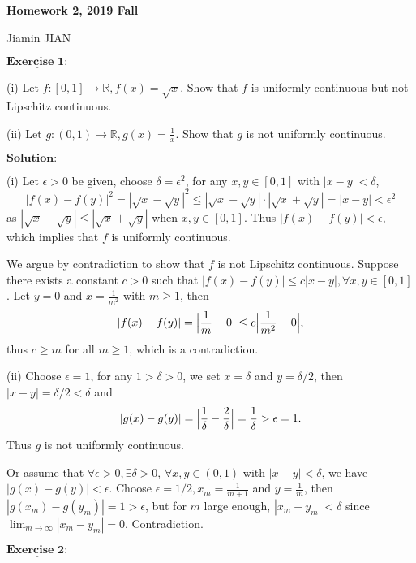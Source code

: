 \documentclass[12pt,a4paper]{ctexart}
\begin{document}
\begin{center}
\textbf{ Homework 2, 2019 Fall}
\vspace{8pt}

Jiamin JIAN
\end{center}

\vspace{12pt}

$\underline{\textbf{Exercise 1:}}$

(i) Let $f: [0,1] \to \mathbb R, f(x) = \sqrt{x}$. Show that $f$ is uniformly continuous but not Lipschitz continuous.

(ii) Let $g: (0,1) \to \mathbb R, g(x) = \frac{1}{x}$. Show that $g$ is not uniformly continuous.

 
\vspace{8pt}
$\textbf{Solution:}$

(i) Let $\epsilon > 0$ be given, choose $\delta = \epsilon^2$, for any $x, y \in [0,1]$ with $|x - y| < \delta$,
$$|f(x) - f(y)|^2 = |\sqrt{x} - \sqrt{y}|^2 \leq |\sqrt{x} - \sqrt{y}| \cdot |\sqrt{x} + \sqrt{y}| = |x - y| < \epsilon^2$$
as $|\sqrt{x} - \sqrt{y}| \leq |\sqrt{x} + \sqrt{y}|$ when $x, y \in [0,1]$. Thus $|f(x) - f(y)| < \epsilon$, which implies that $f$ is uniformly continuous.

We argue by contradiction to show that $f$ is not Lipschitz continuous. Suppose there exists a constant $c>0$ such that $|f(x) - f(y)| \leq c |x-y|, \forall x, y \in [0,1]$. Let $y = 0$ and $x = \frac{1}{m^2}$ with $m \geq 1$, then
$$|f(x) - f(y)| = \Big{|} \frac{1}{m} - 0 \Big{|} \leq c \Big{|} \frac{1}{m^2} - 0 \Big{|},$$
thus $c \geq m$ for all $m \geq 1$, which is a contradiction.

(ii) Choose $\epsilon = 1$, for any $1 > \delta >0$, we set $x = \delta$ and $y = \delta/2$, then $|x - y| = \delta / 2 < \delta$ and
$$|g(x) - g(y)| = \Big{|} \frac{1}{\delta} - \frac{2}{\delta} \Big{|} = \frac{1}{\delta} > \epsilon = 1.$$
Thus $g$ is not uniformly continuous.

Or assume that $\forall \epsilon > 0, \exists \delta > 0$, $\forall x, y \in (0,1)$ with $|x - y| < \delta$, we have $|g(x) - g(y)| < \epsilon$. Choose $\epsilon = 1/2, x_m = \frac{1}{m+1}$ and $y = \frac{1}{m}$, then $|g(x_m) - g(y_m)| = 1 > \epsilon$, but for $m$ large enough, $|x_m - y_m| < \delta$ since $\lim_{m \to \infty} |x_m - y_m| = 0$. Contradiction.



\newpage

$\underline{\textbf{Exercise 2:}}$
\end{document}
